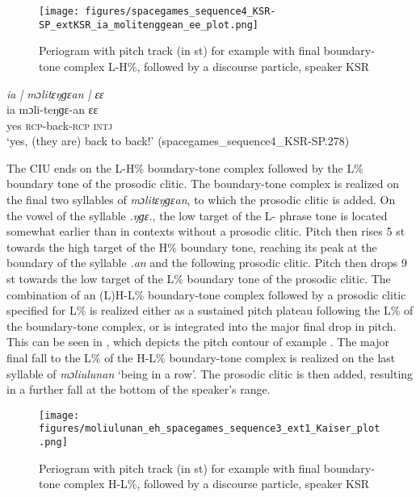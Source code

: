 \begin{figure}
	\texttt{[image: figures/spacegames\_sequence4\_KSR-SP\_extKSR\_ia\_molitenggean\_ee\_plot.png]}
	\caption{Periogram with pitch track (in st) for example  with final boundary-tone complex L-H\%, followed by a discourse particle, speaker KSR}
	\label{pitch:molitenggean ee}
\end{figure}

\ea
\label{ex:molitenggean ee}
\textit{ia | mɔlitɛŋɡɛan | ɛɛ} \\
\gll ia mɔli-teŋɡɛ-an ɛɛ \\
yes \textsc{rcp-}back\textsc{-rcp}  \textsc{intj}\\ 
\glt ‘yes, (they are) back to back!’ \hfill(spacegames\_sequence4\_KSR-SP.278)
\z



The CIU ends on the L-H\% boundary-tone complex followed by the L\% boundary tone of the prosodic clitic. The boundary-tone complex is realized on the final two syllables of \textit{mɔlitɛŋɡɛan}, to which the prosodic clitic is added. On the vowel of the syllable \textit{.ŋɡɛ.}, the low target of the L- phrase tone is located somewhat earlier than in contexts without a prosodic clitic. Pitch then rises 5 st towards the high target of the H\% boundary tone, reaching its peak at the boundary of the syllable \textit{.an} and the following prosodic clitic. Pitch then drops 9 st towards the low target of the L\% boundary tone of the prosodic clitic. The combination of an (L)H-L\% boundary-tone complex followed by a prosodic clitic specified for L\% is realized either as a sustained pitch plateau following the L\% of the boundary-tone complex, or is integrated into the major final drop in pitch. This can be seen in  , which depicts the pitch contour of example . The major final fall to the L\% of the H-L\% boundary-tone complex is realized on the last syllable of \textit{mɔliulunan} ‘being in a row’. The prosodic clitic is then added, resulting in a further fall at the bottom of the speaker’s range.








\begin{figure}
	\texttt{[image: figures/moliulunan\_eh\_spacegames\_sequence3\_ext1\_Kaiser\_plot.png]}
	\caption{Periogram with pitch track (in st) for example  with final boundary-tone complex H-L\%, followed by a discourse particle, speaker KSR}
	\label{pitch:moliulunan ee}
\end{figure}


